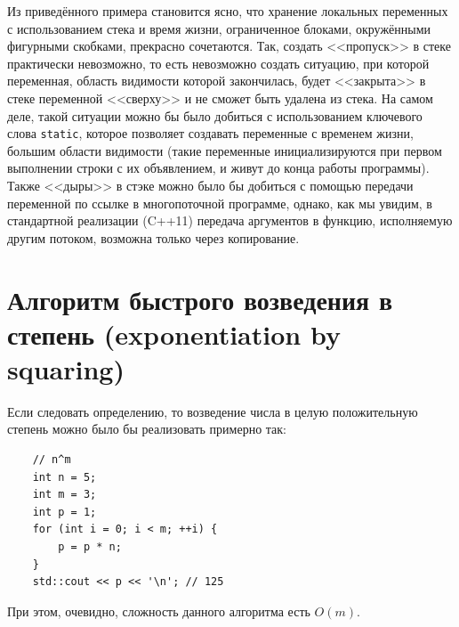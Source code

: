 \documentclass{book}
\begin{document}
\inputminted{cpp}{lifetime.cpp}

Из приведённого примера становится ясно, что хранение локальных переменных с использованием стека и
время жизни, ограниченное блоками, окружёнными фигурными скобками, прекрасно сочетаются. Так,
создать <<пропуск>> в стеке практически невозможно, то есть невозможно создать ситуацию, при
которой переменная, область видимости которой закончилась, будет <<закрыта>> в стеке переменной
<<сверху>> и не сможет быть удалена из стека. На самом деле, такой ситуации можно бы было добиться
с использованием ключевого слова \texttt{static}, которое позволяет создавать переменные с
временем жизни, большим области видимости (такие переменные инициализируются при первом выполнении
строки с их объявлением, и живут до конца работы программы). Также <<дыры>> в стэке можно было бы
добиться с помощью передачи переменной по ссылке в многопоточной программе, однако, как мы увидим,
в стандартной реализации (C++11) передача аргументов в функцию, исполняемую другим потоком,
возможна только через копирование.

\clearpage

\section{Алгоритм быстрого возведения в степень (exponentiation by squaring)}

Если следовать определению, то возведение числа в целую положительную степень можно было бы
реализовать примерно так:
\begin{verbatim}
    // n^m
    int n = 5;
    int m = 3;
    int p = 1;
    for (int i = 0; i < m; ++i) {
        p = p * n;
    }
    std::cout << p << '\n'; // 125
\end{verbatim}
При этом, очевидно, сложность данного алгоритма есть $O(m)$.
\end{document}
